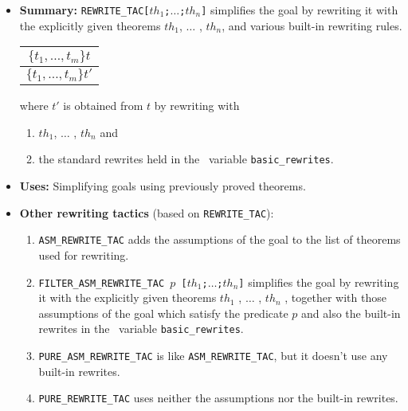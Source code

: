 \begin{itemize}
\item{\bf Summary:} {\small\verb|REWRITE_TAC[|}$th_1${\small\verb|;|}$\ldots${\small\verb|;|}$th_n${\small\verb|]|}
simplifies the goal by rewriting
it with the explicitly given theorems $th_1$, $\ldots$ , $th_n$,
and various built-in rewriting rules.


\begin{center}
\begin{tabular}{c} \\
$\{t_1, \ldots , t_m\}t$
\\ \hline \hline
$\{t_1, \ldots , t_m\}t'$
\\
\end{tabular}
\end{center}

\noindent where $t'$ is obtained from $t$ by rewriting with
\begin{enumerate}
\item  $th_1$, $\ldots$ , $th_n$ and
\item  the standard rewrites held in the \ML\ variable {\small\verb|basic_rewrites|}.
\end{enumerate}

\item{\bf Uses:} Simplifying goals using previously proved theorems.

\item{\bf Other rewriting tactics} (based on {\small\verb|REWRITE_TAC|}):
\begin{enumerate}
\item {\small\verb|ASM_REWRITE_TAC|} adds the assumptions of the goal to the list of
theorems used for rewriting.
\item {\small\verb|FILTER_ASM_REWRITE_TAC |}$p${\small\verb| [|}$th_1${\small\verb|;|}$\ldots${\small\verb|;|}$th_n${\small\verb|]|}
simplifies the goal by rewriting
it with the explicitly given theorems $th_1$ , $\ldots$ , $th_n$ ,
together with those
assumptions of the goal which satisfy the predicate $p$ and also
the built-in rewrites in the \ML\ variable {\small\verb|basic_rewrites|}.
\item {\small\verb|PURE_ASM_REWRITE_TAC|} is like {\small\verb|ASM_REWRITE_TAC|}, but it
doesn't use any built-in rewrites.
\item {\small\verb|PURE_REWRITE_TAC|} uses neither the assumptions nor the built-in
rewrites.
\end{enumerate}
\end{itemize}



